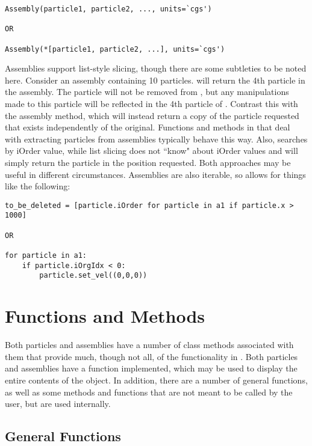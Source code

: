 \begin{verbatim}
Assembly(particle1, particle2, ..., units=`cgs')

OR

Assembly(*[particle1, particle2, ...], units=`cgs')
\end{verbatim}


\noindent Assemblies support list-style slicing, though there are some subtleties to be noted here. Consider an assembly  containing 10 particles.  will return the 4th particle in the assembly. The particle will not be removed from , but any manipulations made to this particle will be reflected in the 4th particle of . Contrast this with the  assembly method, which will instead return a copy of the particle requested that exists independently of the original. Functions and methods in  that deal with extracting particles from assemblies typically behave this way. Also,  searches by iOrder value, while list slicing does not ``know" about iOrder values and will simply return the particle in the position requested. Both approaches may be useful in different circumstances. Assemblies are also iterable, so  allows for things like the following:

\begin{verbatim}
to_be_deleted = [particle.iOrder for particle in a1 if particle.x > 1000]

OR

for particle in a1:
    if particle.iOrgIdx < 0:
        particle.set_vel((0,0,0))
\end{verbatim}

\section{Functions and Methods}

Both particles and assemblies have a number of class methods associated with them that provide much, though not all, of the functionality in . Both particles and assemblies have a  function implemented, which may be used to display the entire contents of the object. In addition, there are a number of general functions, as well as some methods and functions that are not meant to be called by the user, but are used internally.

\subsection{General Functions}

